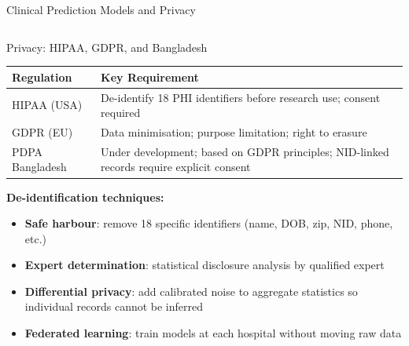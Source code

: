 \documentclass[aspectratio=169,10pt]{beamer}
\begin{document}
\begin{frame}{Clinical Prediction Models and Privacy}
\begin{columns}[T]
      \begin{alertblock}{Privacy: HIPAA, GDPR, and Bangladesh}
        {\small
        \renewcommand{\arraystretch}{1.35}
        \begin{tabular}{p{1.6cm}p{3.0cm}}
          \toprule
          \textbf{Regulation} & \textbf{Key Requirement} \\
          \midrule
          HIPAA (USA) & De-identify 18 PHI identifiers before research use; consent required \\
          GDPR (EU) & Data minimisation; purpose limitation; right to erasure \\
          PDPA Bangladesh & Under development; based on GDPR principles; NID-linked records require explicit consent \\
          \bottomrule
        \end{tabular}
        }
        \vspace{6pt}
        \textbf{De-identification techniques:}
        \begin{itemize}
          \item \textbf{Safe harbour}: remove 18 specific identifiers (name, DOB, zip, NID, phone, etc.)
          \item \textbf{Expert determination}: statistical disclosure analysis by qualified expert
          \item \textbf{Differential privacy}: add calibrated noise to aggregate statistics so individual records cannot be inferred
          \item \textbf{Federated learning}: train models at each hospital without moving raw data
        \end{itemize}
      \end{alertblock}
  \end{columns}
\end{frame}
\end{document}
